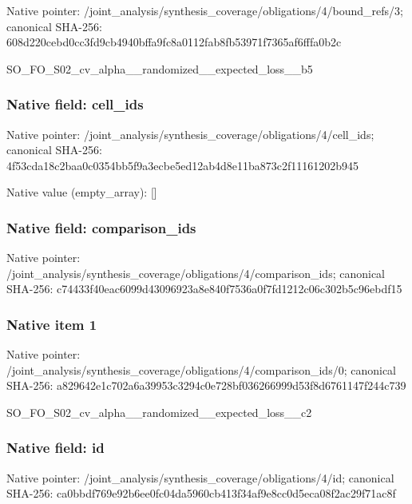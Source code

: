 \documentclass[10pt,a4paper]{article}
\begin{document}
Native pointer: /joint\_analysis/synthesi\allowbreak{}s\_coverage/obligations/4\allowbreak{}/bound\_refs/3; canonical SHA-256: 608d220cebd0cc3fd9cb4940\allowbreak{}bffa9fc8a0112fab8fb53971\allowbreak{}f7365af6fffa0b2c


SO\_FO\_S02\_cv\_alpha\_\_rand\allowbreak{}omized\_\_expected\_loss\_\_b\allowbreak{}5


\subsubsection{Native field: cell\_ids}


Native pointer: /joint\_analysis/synthesi\allowbreak{}s\_coverage/obligations/4\allowbreak{}/cell\_ids; canonical SHA-256: 4f53cda18c2baa0c0354bb5f\allowbreak{}9a3ecbe5ed12ab4d8e11ba87\allowbreak{}3c2f11161202b945



Native value (empty\_array): []



\subsubsection{Native field: comparison\_ids}


Native pointer: /joint\_analysis/synthesi\allowbreak{}s\_coverage/obligations/4\allowbreak{}/comparison\_ids; canonical SHA-256: c74433f40eac6099d4309692\allowbreak{}3a8e840f7536a0f7fd1212c0\allowbreak{}6c302b5c96ebdf15



\subsubsection{Native item 1}


Native pointer: /joint\_analysis/synthesi\allowbreak{}s\_coverage/obligations/4\allowbreak{}/comparison\_ids/0; canonical SHA-256: a829642e1c702a6a39953c32\allowbreak{}94c0e728bf036266999d53f8\allowbreak{}d6761147f244c739


SO\_FO\_S02\_cv\_alpha\_\_rand\allowbreak{}omized\_\_expected\_loss\_\_c\allowbreak{}2


\subsubsection{Native field: id}


Native pointer: /joint\_analysis/synthesi\allowbreak{}s\_coverage/obligations/4\allowbreak{}/id; canonical SHA-256: ca0bbdf769e92b6ee0fc04da\allowbreak{}5960cb413f34af9e8cc0d5ec\allowbreak{}a08f2ac29f71ac8f
\end{document}
